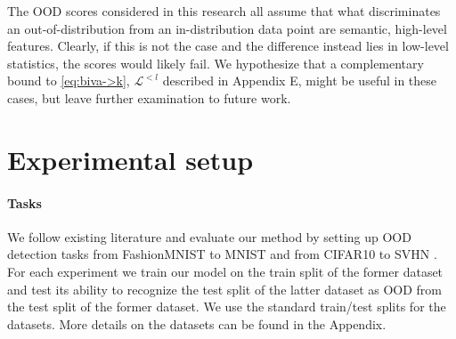 The OOD scores considered in this research all assume that what discriminates an out-of-distribution from an in-distribution data point are semantic, high-level features. Clearly, if this is not the case and the difference instead lies in low-level statistics, the scores would likely fail. We hypothesize that a complementary bound to \cref{eq:biva->k}, $\mathcal{L}^{<l}$ described in Appendix E, might be useful in these cases, but leave further examination to future work.


\section{Experimental setup}

\paragraph{Tasks} We follow existing literature \cite{nalisnick_deep_2019, hendrycks_deep_2019} and evaluate our method by setting up OOD detection tasks from FashionMNIST \cite{xiao_fashionmnist_2017} to MNIST \cite{lecun_gradientbased_1998} and from CIFAR10 \cite{krizhevsky_learning_2009} to SVHN \cite{netzer_reading_2011}.
For each experiment we train our model on the train split of the former dataset and test its ability to recognize the test split of the latter dataset as OOD from the test split of the former dataset.
We use the standard train/test splits for the datasets.
More details on the datasets can be found in the Appendix.


